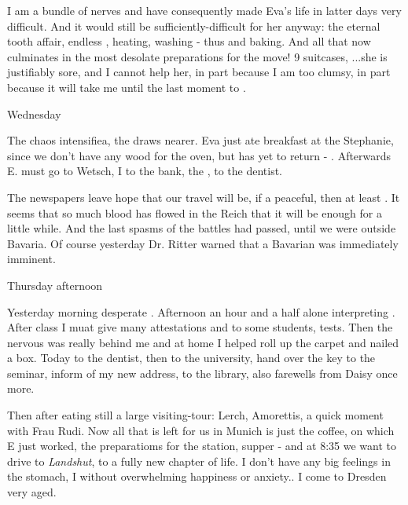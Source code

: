 \documentclass{article}
\begin{document}
I am a bundle of nerves and have consequently made Eva's life in latter days very difficult. And it would still be sufficiently-difficult for her anyway: the eternal tooth affair, endless , heating, washing - thus  and baking. And all that now culminates in the most desolate preparations for the move! 9 suitcases, ...she is justifiably sore, and I cannot help her, in part because I am too clumsy, in part because it will take me until the last moment to .

\date{March 24, 1920}
Wednesday

The chaos intensifiea, the  draws nearer. Eva just ate breakfast at the Stephanie, since we don't have any wood for the oven, but has yet to return - . Afterwards E. must go to Wetsch, I to the bank, the , to the dentist.

The newspapers leave hope that our travel will be, if a peaceful, then at least . It seems that so much blood has flowed in the Reich that it will be enough for a little while. And the last spasms of the battles had passed, until we were outside Bavaria. Of course yesterday Dr. Ritter warned that a Bavarian  was immediately imminent.

\date{March 25, 1920}
Thursday afternoon

Yesterday morning desperate . Afternoon an hour and a half alone interpreting \skipped. After class I muat give many attestations and to some students, tests. Then the nervous was really behind me and at home I helped roll up the carpet and nailed a box. Today to the dentist, then to the university, hand over the key to the seminar, inform of my new address, to the library, also farewells from Daisy once more.

Then after eating still a large visiting-tour: Lerch, Amorettis, a quick moment with Frau Rudi. Now all that is left for us in Munich is just the coffee, on which E just worked, the preparatioms for the station, supper - and at 8:35 we want to drive to \textit{Landshut}, to a fully new chapter of life. I don't have any big feelings in the stomach, I  without overwhelming happiness or anxiety..  I come to Dresden very aged.
\end{document}
